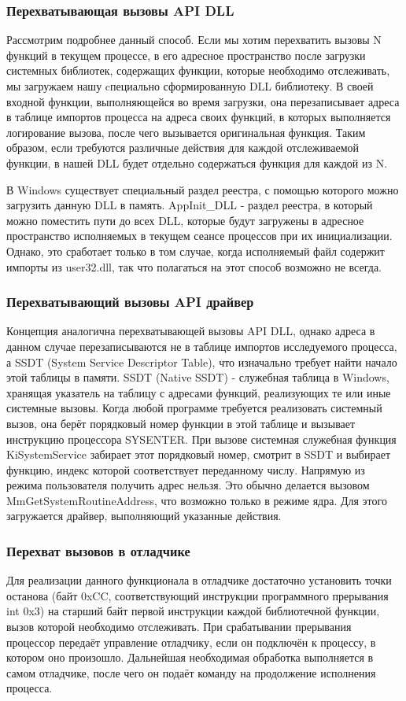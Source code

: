 \subsubsection {Перехватывающая вызовы API DLL}
Рассмотрим подробнее данный способ. Если мы хотим перехватить вызовы N функций в текущем процессе,
 в его адресное пространство после загрузки системных библиотек, содержащих функции, которые необходимо
 отслеживать, мы загружаем нашу cпециально сформированную DLL библиотеку. В своей входной функции,
 выполняющейся во время загрузки, она перезаписывает адреса в таблице импортов процесса на адреса своих
 функций, в которых выполняется логирование вызова, после чего вызывается оригинальная функция. Таким образом, если требуются различные действия для каждой отслеживаемой функции, в нашей DLL будет отдельно
 содержаться функция для каждой из N.
 
В Windows существует специальный раздел реестра, с помощью которого можно загрузить данную DLL в память. AppInit\_DLL - раздел реестра, в который можно поместить пути до всех DLL, которые будут загружены в адресное пространство исполняемых в текущем сеансе процессов при их инициализации. Однако, это сработает только в том случае, когда исполняемый файл содержит импорты из user32.dll, так что полагаться на этот способ возможно не всегда.
\subsubsection {Перехватывающий вызовы API драйвер}
 Концепция аналогична перехватывающей вызовы API DLL, однако адреса в данном случае перезаписываются не в таблице импортов исследуемого процесса, а SSDT (System Service Descriptor Table), что изначально требует найти начало этой таблицы в памяти. SSDT (Native SSDT) - служебная таблица в Windows, хранящая указатель на таблицу с адресами функций, реализующих те или иные системные вызовы. Когда любой программе требуется реализовать системный вызов, она берёт порядковый номер функции в этой таблице и вызывает инструкцию процессора SYSENTER.  При вызове системная служебная функция KiSystemService забирает этот порядковый номер, смотрит в SSDT и выбирает функцию, индекс которой соответствует переданному числу.
Напрямую из режима пользователя получить адрес нельзя. Это обычно делается вызовом MmGetSystemRoutineAddress, что возможно только в режиме ядра. Для этого загружается драйвер, выполняющий указанные действия.
\subsubsection {Перехват вызовов в отладчике}
Для реализации данного функционала в отладчике достаточно установить точки останова (байт 0xCC, соответствующий инструкции программного прерывания int 0x3) на старший байт первой инструкции каждой библиотечной функции, вызов которой необходимо отслеживать. При срабатывании прерывания процессор передаёт управление отладчику, если он подключён к процессу, в котором оно произошло. Дальнейшая необходимая обработка выполняется в самом отладчике, после чего он подаёт команду на продолжение исполнения процесса.
